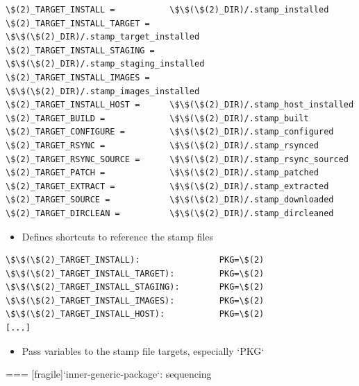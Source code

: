 \begin{block}{}
\begin{verbatim}
\$(2)_TARGET_INSTALL =           \$\$(\$(2)_DIR)/.stamp_installed
\$(2)_TARGET_INSTALL_TARGET =    \$\$(\$(2)_DIR)/.stamp_target_installed
\$(2)_TARGET_INSTALL_STAGING =   \$\$(\$(2)_DIR)/.stamp_staging_installed
\$(2)_TARGET_INSTALL_IMAGES =    \$\$(\$(2)_DIR)/.stamp_images_installed
\$(2)_TARGET_INSTALL_HOST =      \$\$(\$(2)_DIR)/.stamp_host_installed
\$(2)_TARGET_BUILD =             \$\$(\$(2)_DIR)/.stamp_built
\$(2)_TARGET_CONFIGURE =         \$\$(\$(2)_DIR)/.stamp_configured
\$(2)_TARGET_RSYNC =             \$\$(\$(2)_DIR)/.stamp_rsynced
\$(2)_TARGET_RSYNC_SOURCE =      \$\$(\$(2)_DIR)/.stamp_rsync_sourced
\$(2)_TARGET_PATCH =             \$\$(\$(2)_DIR)/.stamp_patched
\$(2)_TARGET_EXTRACT =           \$\$(\$(2)_DIR)/.stamp_extracted
\$(2)_TARGET_SOURCE =            \$\$(\$(2)_DIR)/.stamp_downloaded
\$(2)_TARGET_DIRCLEAN =          \$\$(\$(2)_DIR)/.stamp_dircleaned
\end{verbatim}
\end{block}

\begin{itemize}
\item Defines shortcuts to reference the stamp files
\end{itemize}

\begin{block}{}
\begin{verbatim}
\$\$(\$(2)_TARGET_INSTALL):                PKG=\$(2)
\$\$(\$(2)_TARGET_INSTALL_TARGET):         PKG=\$(2)
\$\$(\$(2)_TARGET_INSTALL_STAGING):        PKG=\$(2)
\$\$(\$(2)_TARGET_INSTALL_IMAGES):         PKG=\$(2)
\$\$(\$(2)_TARGET_INSTALL_HOST):           PKG=\$(2)
[...]
\end{verbatim}
\end{block}

\begin{itemize}
\item Pass variables to the stamp file targets, especially `PKG`
\end{itemize}



=== [fragile]{`inner-generic-package`: sequencing}

